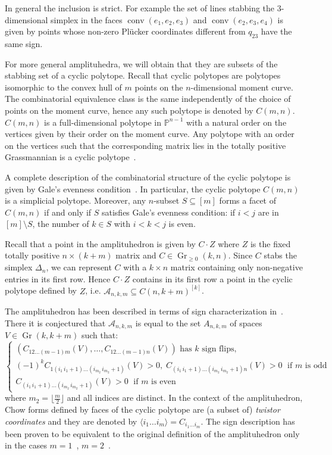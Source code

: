 \documentclass[english]{ourlematema}
\DeclareMathOperator{\Gr}{Gr}
\DeclareMathOperator{\conv}{conv}
\newcommand{\mA}{\mathcal{A}}
\newcommand{\PP}{\mathbb{P}}
\begin{document}
\begin{rem}
    In general the inclusion is strict. For example the set of lines stabbing the $3$-dimensional simplex in the faces $\conv(e_1,e_2,e_3)$ and $\conv(e_2,e_3,e_4)$ is given by points whose non-zero Pl\"ucker coordinates different from $q_{23}$ have the same sign.
\end{rem}

For more general amplituhedra, we will obtain that they are subsets of the stabbing set of a cyclic polytope.
Recall that cyclic polytopes are polytopes isomorphic to the convex hull of $m$ points on the $n$-dimensional moment curve. The combinatorial equivalence class is the same independently of the choice of points on the moment curve, hence any such polytope is denoted by $C(m,n)$. $C(m,n)$ is a full-dimensional polytope in $\PP^{n-1}$ with a natural order on the vertices given by their order on the moment curve.
Any polytope with an order on the vertices such that the corresponding matrix lies in the totally positive Grassmannian is a cyclic polytope~\cite{SturmfelsCyclic}.

A complete description of the combinatorial structure of the cyclic polytope is given by Gale's evenness condition~\cite{gale}.
In particular, the cyclic polytope $C(m,n)$ is a simplicial polytope. Moreover, any $n$-subset $S\subseteq [m]$ forms a facet of $C(m,n)$ if and only if $S$ satisfies Gale's evenness condition: if $i<j$ are in $[m]\setminus S$, the number of $k\in S$ with $i<k<j$ is even. 

\vspace{5pt}

Recall that a point in the amplituhedron is given by $C\cdot Z$ where $Z$ is the fixed totally positive $n\times(k+m)$ matrix and $C\in \Gr_{\geq 0}(k,n)$. Since $C$ stabs the simplex $\Delta_n$, we can represent $C$ with a $k\times n$ matrix containing only non-negative entries in its first row. Hence $C\cdot Z$ contains in its first row a point in the cyclic polytope defined by $Z$, i.e. $\mA_{n,k,m}\subseteq C(n, k+m)^{[k]}$.

The amplituhedron has been described in terms of sign characterization in~\cite{unwinding}. There it is conjectured that $\mA_{n,k,m}$ is equal to the set $A_{n,k,m}$ of spaces $V\in \Gr(k,k+m)$ such that:
\[ \begin{cases}
(C_{12\ldots (m-1)m}(V), \ldots ,C_{12\ldots(m-1)n}(V)) \text{ has } k \text{ sign flips,}\\
(-1)^kC_{1(i_1\,i_1 +1)\ldots(i_{m_2}\, i_{m_2}+1)}(V)>0, \; C_{(i_1\,i_1 +1)\ldots(i_{m_2}\, i_{m_2}+1)n}(V)>0 \; \text{ if } m \text{ is odd} \\
C_{(i_1\,i_1 +1)\ldots\left(i_{m_2}\, i_{m_2}+1\right)}(V)>0 \; \text{ if } m \text{ is even}
\end{cases}
\]
where $m_2 = \lfloor{\frac{m}{2}}\rfloor$ and all indices are distinct. In the context of the amplituhedron, Chow forms defined by faces of the cyclic polytope are (a subset of) {\em twistor coordinates} and they are denoted by $\langle i_1\ldots i_m \rangle = C_{i_1\ldots i_m}$.
The sign description has been proven to be equivalent to the original definition of the amplituhedron only in the cases $m=1$~\cite{m=1Amplituhedron}, $m=2$~\cite{m2signs}. 
\end{document}
